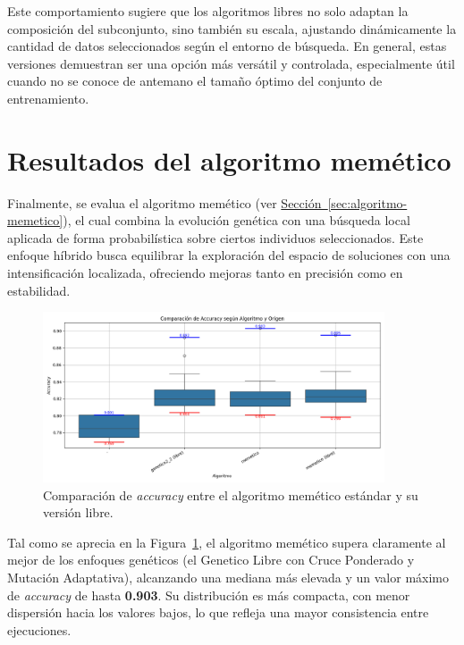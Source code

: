 Este comportamiento sugiere que los algoritmos libres no solo adaptan la composición del subconjunto, sino también su escala,
ajustando dinámicamente la cantidad de datos seleccionados según el entorno de búsqueda.
En general, estas versiones demuestran ser una opción más versátil y controlada, especialmente útil cuando no se conoce de antemano el tamaño óptimo del conjunto de entrenamiento.


\section{Resultados del algoritmo memético}\label{sec:resultados-algoritmo-memetico}
Finalmente, se evalua el algoritmo memético (ver \hyperref[sec:algoritmo-memetico]{Sección~\ref*{sec:algoritmo-memetico}}),
el cual combina la evolución genética con una búsqueda local aplicada de forma probabilística sobre ciertos individuos seleccionados.
Este enfoque híbrido busca equilibrar la exploración del espacio de soluciones con una intensificación localizada,
ofreciendo mejoras tanto en precisión como en estabilidad.


\begin{figure}[htp]
    \centering
    \includegraphics[width=0.9\textwidth]{imagenes/evaluaciones/comparacion-memetico}
    \caption{Comparación de \textit{accuracy} entre el algoritmo memético estándar y su versión libre.}
    \label{fig:memetico_comparacion}
\end{figure}

Tal como se aprecia en la Figura~\ref{fig:memetico_comparacion}, el algoritmo memético supera claramente al mejor de los enfoques genéticos
(el Genetico Libre con Cruce Ponderado y Mutación Adaptativa), alcanzando una mediana más elevada y un valor máximo de \textit{accuracy} de hasta \textbf{0.903}.
Su distribución es más compacta, con menor dispersión hacia los valores bajos, lo que refleja una mayor consistencia entre ejecuciones.

